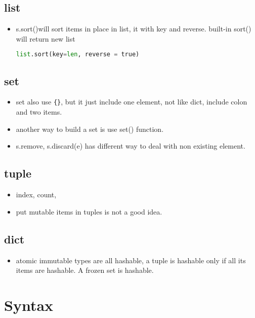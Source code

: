 \documentclass[a4paper,12pt,twoside]{book}
\begin{document}
\subsection{list}
\begin{itemize}
	\item s.sort()will sort items in place in list, it with key and reverse. built-in sort() will return new list
	\begin{lstlisting}[frame=single, language=Python]
	list.sort(key=len, reverse = true)
	\end{lstlisting}  
\end{itemize}
\subsection{set}
\begin{itemize}
	\item set also use \verb|{}|, but it just include one element, not like dict, include colon and two items. 
	\item another way to build a set is use set() function. 
	\item s.remove, s.discard(e) has different way to deal with non existing element. 
\end{itemize}
\subsection{tuple}
\begin{itemize}
	\item index, count, 
	\item put mutable items in tuples is not a good idea. 
\end{itemize}
\subsection{dict}
\begin{itemize}
	\item atomic immutable types are all hashable, a tuple is hashable only if all its items are hashable. A frozen set is hashable. 
	
\end{itemize}

\section{Syntax}
\end{document}
